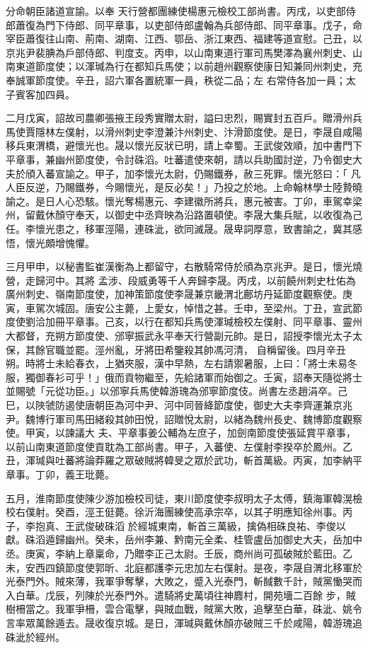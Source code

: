 \begin{pinyinscope}
 分命朝臣諸道宣諭。以奉
 天行營都團練使楊惠元檢校工部尚書。丙戌，以吏部侍郎蕭復為門下侍郎、同平章事，以吏部侍郎盧翰為兵部侍郎、同平章事。戊子，命宰臣蕭復往山南、荊南、湖南、江西、鄂岳、浙江東西、福建等道宣慰。己丑，以京兆尹裴腆為戶部侍郎、判度支。丙申，以山南東道行軍司馬樊澤為襄州刺史、山南東道節度使；以渾瑊為行在都知兵馬使；以前趙州觀察使康日知兼同州刺史，充奉誠軍節度使。辛丑，詔六軍各置統軍一員，秩從二品；左
 右常侍各加一員；太子賓客加四員。



 二月戊寅，詔故司農卿張掖王段秀實贈太尉，謚曰忠烈，賜實封五百戶。贈滑州兵馬使賈隱林左僕射，以滑州刺史李澄兼汴州刺史、汴滑節度使。是日，李晟自咸陽移兵東渭橋，避懷光也。晟以懷光反狀已明，請上幸蜀。王武俊效順，加中書門下平章事，兼幽州節度使，令討硃滔。吐蕃遣使來朝，請以兵助國討逆，乃令御史大夫於頎入蕃宣諭之。甲子，加李懷光太尉，仍賜鐵券，赦三死罪。懷光怒曰：「
 凡人臣反逆，乃賜鐵券，今賜懷光，是反必矣！」乃投之於地。上命翰林學士陸贄曉諭之。是日人心恐駭。懷光奪楊惠元、李建徽所將兵，惠元被害。丁卯，車駕幸梁州，留戴休顏守奉天，以御史中丞齊映為沿路置頓使。李晟大集兵賦，以收復為己任。李懷光患之，移軍涇陽，連硃泚，欲同滅晟。晟卑詞厚意，致書諭之，冀其感悟，懷光頗增愧懼。



 三月甲申，以秘書監崔漢衡為上都留守，右散騎常侍於頎為京兆尹。是日，懷光燒營，走歸河中。其將
 孟涉、段威勇等千人奔歸李晟。丙戌，以前饒州刺史杜佑為廣州刺史、嶺南節度使，加神策節度使李晟兼京畿渭北鄜坊丹延節度觀察使。庚寅，車駕次城固。唐安公主薨，上愛女，悼惜之甚。壬申，至梁州。丁丑，宣武節度使劉洽加冊平章事。己亥，以行在都知兵馬使渾瑊檢校左僕射、同平章事、靈州大都督，充朔方節度使、邠寧振武永平奉天行營副元帥。是日，詔授李懷光太子太保，其餘官職並罷。涇州亂，牙將田希鑒殺其帥馮河清，
 自稱留後。四月辛丑朔。時將士未給春衣，上猶夾服，漢中早熱，左右請禦暑服，上曰：「將士未易冬服，獨御春衫可乎！」俄而貢物繼至，先給諸軍而始御之。壬寅，詔奉天隨從將士並賜號「元從功臣。」以邠寧兵馬使韓游瑰為邠寧節度伎。尚書左丞趙涓卒。己巳，以陜虢防遏使唐朝臣為河中尹、河中同晉絳節度使，御史大夫李齊運兼京兆尹。魏博行軍司馬田緒殺其帥田悅，詔贈悅太尉，以緒為魏州長史、魏博節度觀察使。甲寅，以諫議大
 夫、平章事姜公輔為左庶子，加劍南節度使張延賞平章事，以前山南東道節度使貢耽為工部尚書。甲子，入蕃使、左僕射李揆卒於鳳州。乙丑，渾瑊與吐蕃將論莽羅之眾破賊將韓旻之眾於武功，斬首萬級。丙寅，加李納平章事。丁卯，義王玭薨。



 五月，淮南節度使陳少游加檢校司徒，東川節度使李叔明太子太傅，鎮海軍韓滉檢校右僕射。癸酉，涇王侹薨。徐沂海團練使高承宗卒，以其子明應知徐州事。丙子，李抱真、王武俊破硃滔
 於經城東南，斬首三萬級，擒偽相硃良祐、李俊以獻。硃滔遁歸幽州。癸未，岳州李兼、黔南元全柔、桂管盧岳加御史大夫，岳加中丞。庚寅，李納上章稟命，乃贈李正己太尉。壬辰，商州尚可孤破賊於藍田。乙未，安西四鎮節度使郭昕、北庭都護李元忠加左右僕射。是夜，李晟自渭北移軍於光泰門外。賊來薄，我軍爭奪擊，大敗之，蹙入光泰門，斬馘數千計，賊黨慟哭而入白華。戊辰，列陳於光泰門外。遣騎將史萬頃往神麚村，開苑墻二百餘
 步，賊樹柵當之。我軍爭柵，雲合電擊，與賊血戰，賊黨大敗，追擊至白華，硃泚、姚令言率眾萬餘遁去。晟收復京城。是日，渾瑊與戴休顏亦破賊三千於咸陽，韓游瑰追硃泚於經州。




\end{pinyinscope}
